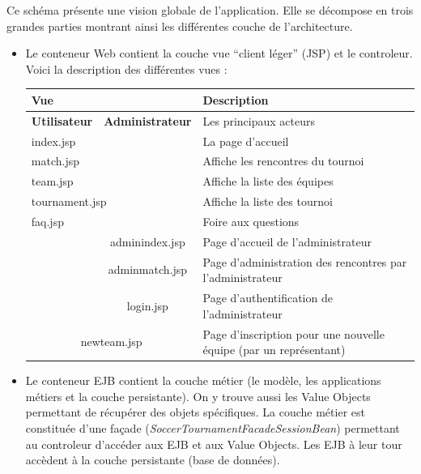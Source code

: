 \documentclass[10pt]{report}
\begin{document}
Ce schéma présente une vision globale de l'application. Elle se décompose en trois grandes parties montrant ainsi les différentes couche de l'architecture. \\
\renewcommand\labelitemi{\textbullet}
\begin{itemize}
 \item Le conteneur Web contient la couche vue \enquote{client léger} (JSP) et le controleur. Voici la description des différentes vues :
 
\begin{table}[here]
    \begin{center}
	\begin{tabular}{|c|c|l|}
	\hline
	\multicolumn{2}{|l|}{\textbf{Vue}} & \textbf{Description}  \\
	\hline
	\textbf{Utilisateur}	& \textbf{Administrateur}& Les principaux acteurs  \\
	\hline
	\multicolumn{2}{|l|}{index.jsp}	& La page d'accueil \\
	\hline
	\multicolumn{2}{|l|}{match.jsp}	& Affiche les rencontres du tournoi\\
	\hline
	\multicolumn{2}{|l|}{team.jsp}		& Affiche la liste des équipes\\
	\hline
	\multicolumn{2}{|l|}{tournament.jsp}	& Affiche la liste des tournoi\\
	\hline
	\multicolumn{2}{|l|}{faq.jsp} 		& Foire aux questions\\
	\hline
				& adminindex.jsp& Page d'accueil de l'administrateur\\
	\hline
				& adminmatch.jsp& Page d'administration des rencontres par l'administrateur\\
	\hline
				& login.jsp& Page d'authentification de l'administrateur\\
	\hline
	\multicolumn{2}{|c|}{newteam.jsp}& Page d'inscription pour une nouvelle équipe (par un représentant)\\
	\hline
	\end{tabular}
    \end{center}
\end{table} 
 \item Le conteneur EJB contient la couche métier (le modèle, les applications métiers et la couche persistante). On y trouve aussi les Value Objects permettant de récupérer des objets spécifiques. La couche métier est constituée d'une façade (\textit{SoccerTournamentFacadeSessionBean}) permettant
 au controleur d'accéder aux EJB et aux Value Objects. Les EJB à leur tour accèdent à la couche persistante (base de données).
\end{itemize}
\end{document}
